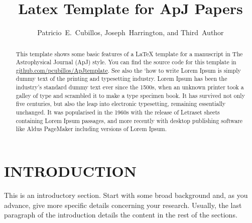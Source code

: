 





\title{Latex Template for ApJ Papers}

\author{Patricio~E.~Cubillos,
Joseph~Harrington,
and
Third~Author
}



\begin{abstract}
  This template shows some basic features of a LaTeX template for a
  manuscript in The Astrophysical Journal (ApJ) style.  You can find
  the source code for this template in
  \href{https://github.com/pcubillos/ApJtemplate}
  {github.com/pcubillos/ApJtemplate}.
  See also the `how to write
  Lorem Ipsum is simply dummy text of the printing and typesetting
  industry. Lorem Ipsum has been the industry's standard dummy text ever
  since the 1500s, when an unknown printer took a galley of type and
  scrambled it to make a type specimen book. It has survived not only
  five centuries, but also the leap into electronic typesetting,
  remaining essentially unchanged. It was popularised in the 1960s with
  the release of Letraset sheets containing Lorem Ipsum passages, and
  more recently with desktop publishing software like Aldus PageMaker
  including versions of Lorem Ipsum.
\end{abstract}



\section{INTRODUCTION}
\label{introduction}

This is an introductory section.  Start with some broad background and,
as you advance, give more specific details concerning your research.
Usually, the last paragraph of the introduction details the content in
the rest of the sections.

